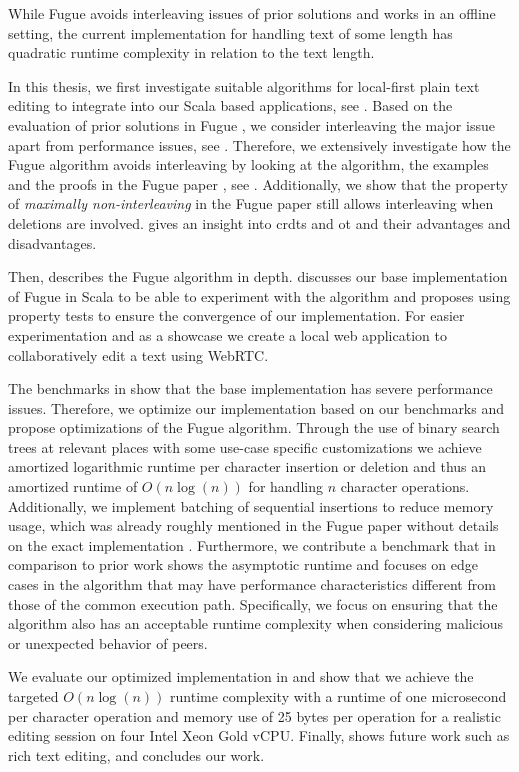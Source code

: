 While Fugue \cite{2023-weidner-minimizing-interleaving} avoids interleaving issues of prior solutions and works in an offline setting, the current implementation for handling text of some length has quadratic runtime complexity in relation to the text length.

In this thesis, we first investigate suitable algorithms for local-first plain text editing to integrate into our Scala based applications, see . Based on the evaluation of prior solutions in Fugue \cite{2023-weidner-minimizing-interleaving}, we consider interleaving the major issue apart from performance issues, see . Therefore, we extensively investigate how the Fugue algorithm avoids interleaving by looking at the algorithm, the examples and the proofs in the Fugue paper \cite{2023-weidner-minimizing-interleaving}, see . Additionally, we show that the property of \textit{maximally non-interleaving} in the Fugue paper \cite{2023-weidner-minimizing-interleaving} still allows interleaving when deletions are involved.
 gives an insight into \glspl{crdt} and \gls{ot} and their advantages and disadvantages.

Then,  describes the Fugue algorithm \cite{2023-weidner-minimizing-interleaving} in depth.
 discusses our base implementation of Fugue in Scala to be able to experiment with the algorithm and proposes using property tests to ensure the convergence of our implementation. For easier experimentation and as a showcase we create a local web application to collaboratively edit a text using WebRTC.

The benchmarks in  show that the base implementation has severe performance issues. Therefore, we optimize our implementation based on our benchmarks and propose optimizations of the Fugue algorithm. Through the use of binary search trees at relevant places with some use-case specific customizations we achieve amortized logarithmic runtime per character insertion or deletion and thus an amortized runtime of $O(n \log(n))$ for handling $n$ character operations. Additionally, we implement batching of sequential insertions to reduce memory usage, which was already roughly mentioned in the Fugue paper without details on the exact implementation \cite{2023-weidner-minimizing-interleaving}. Furthermore, we contribute a benchmark that in comparison to prior work shows the asymptotic runtime and focuses on edge cases in the algorithm that may have performance characteristics different from those of the common execution path. Specifically, we focus on ensuring that the algorithm also has an acceptable runtime complexity when considering malicious or unexpected behavior of peers.

We evaluate our optimized implementation in  and show that we achieve the targeted $O(n \log(n))$ runtime complexity with a runtime of one microsecond per character operation and memory use of 25 bytes per operation for a realistic editing session on four Intel Xeon Gold vCPU.
Finally,  shows future work such as rich text editing, and  concludes our work.
